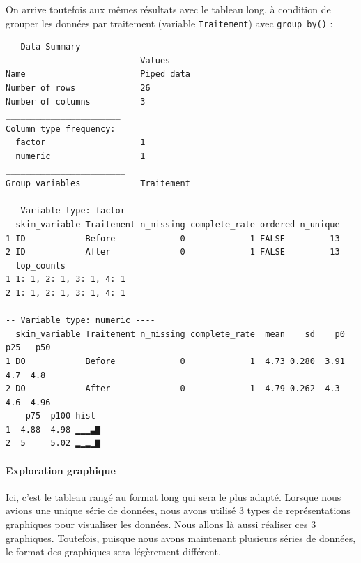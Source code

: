 \documentclass[a4paperpaper,]{article}
\newenvironment{Shaded}{\begin{snugshade}}{\end{snugshade}}
\newcommand{\KeywordTok}[1]{\textcolor[rgb]{0.12,0.11,0.11}{\textbf{#1}}}
\newcommand{\NormalTok}[1]{\textcolor[rgb]{0.12,0.11,0.11}{#1}}
\newcommand{\OperatorTok}[1]{\textcolor[rgb]{0.12,0.11,0.11}{#1}}
\newcommand{\StringTok}[1]{\textcolor[rgb]{0.75,0.01,0.01}{#1}}
\let\oldparagraph\paragraph
\renewcommand{\paragraph}[1]{\oldparagraph{#1}\mbox{}}
\begin{document}
On arrive toutefois aux mêmes résultats avec le tableau long, à condition de grouper les données par traitement (variable \texttt{Traitement}) avec \texttt{group\_by()} :

\begin{Shaded}
\end{Shaded}

\begin{verbatim}
-- Data Summary ------------------------
                           Values    
Name                       Piped data
Number of rows             26        
Number of columns          3         
_______________________              
Column type frequency:               
  factor                   1         
  numeric                  1         
________________________             
Group variables            Traitement

-- Variable type: factor -----
  skim_variable Traitement n_missing complete_rate ordered n_unique
1 ID            Before             0             1 FALSE         13
2 ID            After              0             1 FALSE         13
  top_counts            
1 1: 1, 2: 1, 3: 1, 4: 1
2 1: 1, 2: 1, 3: 1, 4: 1

-- Variable type: numeric ----
  skim_variable Traitement n_missing complete_rate  mean    sd    p0   p25   p50
1 DO            Before             0             1  4.73 0.280  3.91   4.7  4.8 
2 DO            After              0             1  4.79 0.262  4.3    4.6  4.96
    p75  p100 hist 
1  4.88  4.98 ▁▁▁▃▇
2  5     5.02 ▂▁▂▁▇
\end{verbatim}

\hypertarget{exploration-graphique-1}{%
\paragraph{Exploration graphique}\label{exploration-graphique-1}}

Ici, c'est le tableau rangé au format long qui sera le plus adapté. Lorsque nous avions une unique série de données, nous avons utilisé 3 types de représentations graphiques pour visualiser les données. Nous allons là aussi réaliser ces 3 graphiques. Toutefois, puisque nous avons maintenant plusieurs séries de données, le format des graphiques sera légèrement différent.
\end{document}
